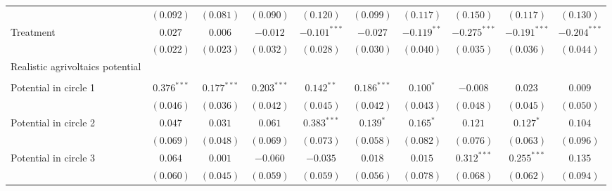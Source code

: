 \begin{center}
\begin{small}
\begin{longtable}{l@{} c@{} c@{} c@{} c@{} c@{} c@{} c@{} c@{} c@{}}
                                    & $(0.092)$       & $(0.081)$       & $(0.090)$       & $(0.120)$        & $(0.099)$     & $(0.117)$        & $(0.150)$        & $(0.117)$        & $(0.130)$        \\
Treatment                           & $0.027$         & $0.006$         & $-0.012$        & $-0.101^{***}$   & $-0.027$      & $-0.119^{**}$    & $-0.275^{***}$   & $-0.191^{***}$   & $-0.204^{***}$   \\
                                    & $(0.022)$       & $(0.023)$       & $(0.032)$       & $(0.028)$        & $(0.030)$     & $(0.040)$        & $(0.035)$        & $(0.036)$        & $(0.044)$        \\
Realistic agrivoltaics potential    &                 &                 &                 &                  &               &                  &                  &                  &                  \\
                                    &                 &                 &                 &                  &               &                  &                  &                  &                  \\
\quad Potential in circle 1         & $0.376^{***}$   & $0.177^{***}$   & $0.203^{***}$   & $0.142^{**}$     & $0.186^{***}$ & $0.100^{*}$      & $-0.008$         & $0.023$          & $0.009$          \\
                                    & $(0.046)$       & $(0.036)$       & $(0.042)$       & $(0.045)$        & $(0.042)$     & $(0.043)$        & $(0.048)$        & $(0.045)$        & $(0.050)$        \\
\quad Potential in circle 2         & $0.047$         & $0.031$         & $0.061$         & $0.383^{***}$    & $0.139^{*}$   & $0.165^{*}$      & $0.121$          & $0.127^{*}$      & $0.104$          \\
                                    & $(0.069)$       & $(0.048)$       & $(0.069)$       & $(0.073)$        & $(0.058)$     & $(0.082)$        & $(0.076)$        & $(0.063)$        & $(0.096)$        \\
\quad Potential in circle 3         & $0.064$         & $0.001$         & $-0.060$        & $-0.035$         & $0.018$       & $0.015$          & $0.312^{***}$    & $0.255^{***}$    & $0.135$          \\
                                    & $(0.060)$       & $(0.045)$       & $(0.059)$       & $(0.059)$        & $(0.056)$     & $(0.078)$        & $(0.068)$        & $(0.062)$        & $(0.094)$        \\

\end{longtable}
\end{small}
\end{center}
